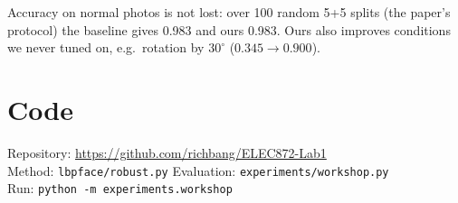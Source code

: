 \documentclass{article}
\newcommand{\repo}{\url{https://github.com/richbang/ELEC872-Lab1}}
\begin{document}
\noindent Accuracy on normal photos is not lost: over 100 random 5+5 splits (the paper's
protocol) the baseline gives 0.983 and ours 0.983. Ours also improves conditions we never
tuned on, e.g.\ rotation by $30^\circ$ ($0.345 \to 0.900$).

\section{Code}

\noindent Repository: \repo\\
Method: \texttt{lbpface/robust.py} \quad Evaluation: \texttt{experiments/workshop.py}\\
Run: \texttt{python -m experiments.workshop}



\end{document}
